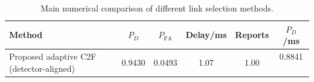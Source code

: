 \begin{table}[t]
    \centering
    \caption{Main numerical comparison of different link selection methods.}
    \label{tab:main_summary}
    \begin{tabular}{l c c c c c}
        \hline
        Method & $P_D$ & $P_{\mathrm{FA}}$ & Delay/ms & Reports & $P_D$/ms \\
        \hline
        Proposed adaptive C2F (detector-aligned) & 0.9430 & 0.0493 & 1.07 & 1.00 & 0.8841 \
        \hline
    \end{tabular}
\end{table}
